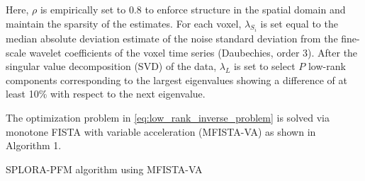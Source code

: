 Here, $\rho$ is empirically set to 0.8 to enforce structure in the spatial
domain and maintain the sparsity of the estimates. For each voxel,
$\lambda_{S_i}$ is set equal to the median absolute deviation estimate  of the
noise standard deviation from the fine-scale wavelet coefficients of the voxel
time series (Daubechies, order 3). After the singular value decomposition
(SVD) of the data, $\lambda_L$ is set to select $P$ low-rank
components corresponding to the largest eigenvalues showing a difference of at
least 10\% with respect to the next eigenvalue. 

The optimization problem in \cref{eq:low_rank_inverse_problem} is solved via
monotone FISTA with variable acceleration (MFISTA-VA)
\citep{Zibetti2018MonotoneFISTAvariable} as shown in Algorithm 1.

\begin{algorithm}[tb]
    \label{alg:1}
    \caption{SPLORA-PFM algorithm using MFISTA-VA}
\end{algorithm}
